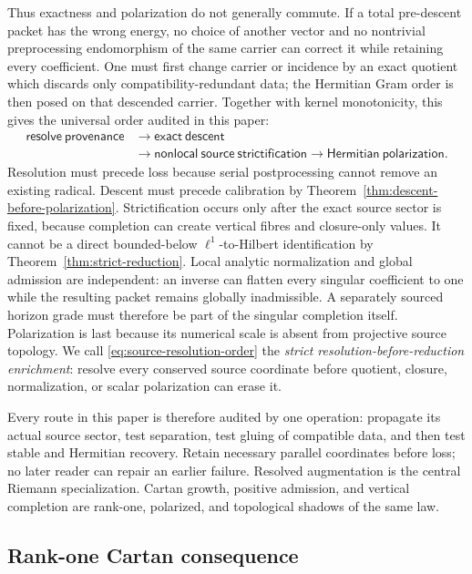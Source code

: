 \documentclass[11pt]{article}
\theoremstyle{definition}
\theoremstyle{remark}
\begin{document}
Thus exactness and polarization do not generally commute.  If a total
pre-descent packet has the wrong energy, no choice of another vector and no
nontrivial preprocessing endomorphism of the same carrier can correct it
while retaining every coefficient.  One must first change carrier or
incidence by an exact quotient which discards only compatibility-redundant
data; the Hermitian Gram order is then posed on that descended carrier.
Together with kernel monotonicity, this gives the universal order audited in
this paper:
\[
 \begin{aligned}
 \mathsf{resolve\ provenance}&\longrightarrow\mathsf{exact\ descent}\\[-2pt]
 &\longrightarrow\mathsf{nonlocal\ source\ strictification}
 \longrightarrow\mathsf{Hermitian\ polarization}.
 \end{aligned}
\tag{2.0k}\label{eq:source-resolution-order}
\]
Resolution must precede loss because serial postprocessing cannot remove an
existing radical.  Descent must precede calibration by
Theorem~\ref{thm:descent-before-polarization}.  Strictification occurs only
after the exact source sector is fixed, because completion can create
vertical fibres and closure-only values.  It cannot be a direct
bounded-below \(\ell^1\)-to-Hilbert identification by
Theorem~\ref{thm:strict-reduction}.  Local analytic normalization and global admission are independent:
an inverse can flatten every singular coefficient to one while the resulting
packet remains globally inadmissible.  A separately sourced horizon grade
must therefore be part of the singular completion itself.
Polarization is last because its numerical scale is absent from projective
source topology.  We call \eqref{eq:source-resolution-order} the
\emph{strict resolution-before-reduction enrichment}: resolve every conserved source
coordinate before quotient, closure, normalization, or scalar polarization
can erase it.

Every route in this paper is therefore audited by one operation: propagate
its actual source sector, test separation, test gluing of compatible data,
and then test stable and Hermitian recovery.  Retain necessary parallel
coordinates before loss; no later reader can repair an earlier failure.
Resolved augmentation is the central Riemann specialization.  Cartan
growth, positive admission, and vertical completion are rank-one,
polarized, and topological shadows of the same law.

\subsection{Rank-one Cartan consequence}
\end{document}
